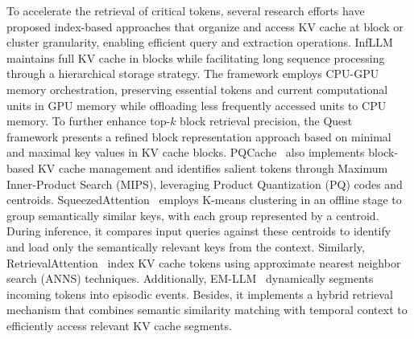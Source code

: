 To accelerate the retrieval of critical tokens, several research efforts have proposed 
index-based approaches that organize and access KV cache at block or cluster granularity, 
enabling efficient query and extraction operations.
InfLLM~\cite{xiao2024infllmtrainingfreelongcontextextrapolation} maintains full KV cache in blocks while facilitating long sequence 
processing through a hierarchical storage strategy. The framework employs CPU-GPU memory 
orchestration, preserving essential tokens and current computational units in GPU memory 
while offloading less frequently accessed units to CPU memory.
To further enhance top-$k$ block retrieval precision, the Quest~\cite{DBLP:conf/icml/TangZZXKH24} framework presents a refined block representation approach 
based on minimal and maximal key values in KV cache blocks. 
PQCache~\cite{zhang2024pqcache} also implements block-based KV cache management and 
identifies salient tokens through Maximum Inner-Product Search (MIPS), leveraging Product 
Quantization (PQ) codes and centroids.
SqueezedAttention~\cite{hooper2024squeezedattentionacceleratinglong} employs K-means clustering in an offline stage to group 
semantically similar keys, with each group represented by a centroid. During inference, it compares input queries against these 
centroids to identify and load only the semantically relevant keys from the context.
Similarly, RetrievalAttention~\cite{DBLP:journals/corr/abs-2409-10516} index KV cache tokens using approximate
nearest neighbor search (ANNS) techniques.
Additionally, EM-LLM~\cite{DBLP:journals/corr/abs-2407-09450} dynamically segments incoming 
tokens into episodic events. Besides, it implements 
a hybrid retrieval mechanism that combines semantic similarity matching with temporal 
context to efficiently access relevant KV cache segments.




